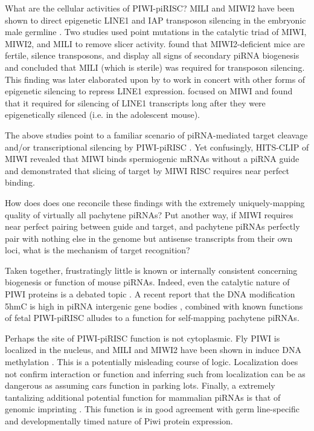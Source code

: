     What are the cellular activities of PIWI-piRISC? MILI and MIWI2 have been shown to direct epigenetic LINE1 and IAP transposon silencing in the embryonic male germline \citep{Aravin2007,Carmell2007,Kuramochi2008}. Two studies \citep{DeFazio2011,Reuter2011} used point mutations in the catalytic triad of MIWI, MIWI2, and MILI to remove slicer activity. \citet{DeFazio2011} found that MIWI2-deficient mice are fertile, silence transposons, and display all signs of secondary piRNA biogenesis and concluded that MILI (which is sterile) was required for transposon silencing. This finding was later elaborated upon by \citet{DiGiacomo2013} to work in concert with other forms of epigenetic silencing to repress LINE1 expression. \citet{Reuter2011} focused on MIWI and found that it required for silencing of LINE1 transcripts long after they were epigenetically silenced (i.e. in the adolescent mouse).

    The above studies point to a familiar scenario of piRNA-mediated target cleavage and/or transcriptional silencing by PIWI-piRISC \citep{Meister2013}. Yet confusingly, HITS-CLIP of MIWI revealed that MIWI binds spermiogenic mRNAs without a piRNA guide \citep{Vourekas2012} and \citet{Reuter2011} demonstrated that slicing of target by MIWI RISC requires near perfect binding.

    How does does one reconcile these findings with the extremely uniquely-mapping quality of virtually all pachytene piRNAs? Put another way, if MIWI requires near perfect pairing between guide and target, and pachytene piRNAs perfectly pair with nothing else in the genome but antisense transcripts from their own loci, what is the mechanism of target recognition?

    Taken together, frustratingly little is known or internally consistent concerning biogenesis or function of mouse piRNAs. Indeed, even the catalytic nature of PIWI proteins is a debated topic \citep{Luteijn2013,Meister2013}. A recent report that the DNA modification 5hmC is high in piRNA intergenic gene bodies \citep{Gan2013}, combined with known functions of fetal PIWI-piRISC alludes to a function for self-mapping pachytene piRNAs.

    Perhaps the site of PIWI-piRISC function is not cytoplasmic. Fly PIWI is localized in the nucleus, and MILI and MIWI2 have been shown in induce DNA methylation \citep{Cox2000,Aravin2008}. This is a potentially misleading course of logic. Localization does not confirm interaction \citep{North2006} or function and inferring such from localization can be as dangerous as assuming cars function in parking lots. Finally, a extremely tantalizing additional potential function for mammalian piRNAs is that of genomic imprinting \citep{Watanabe2011}. This function is in good agreement with germ line-specific and developmentally timed nature of Piwi protein expression.

